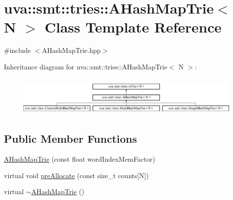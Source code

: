 \hypertarget{classuva_1_1smt_1_1tries_1_1_a_hash_map_trie}{}\section{uva\+:\+:smt\+:\+:tries\+:\+:A\+Hash\+Map\+Trie$<$ N $>$ Class Template Reference}
\label{classuva_1_1smt_1_1tries_1_1_a_hash_map_trie}


{\ttfamily \#include $<$A\+Hash\+Map\+Trie.\+hpp$>$}

Inheritance diagram for uva\+:\+:smt\+:\+:tries\+:\+:A\+Hash\+Map\+Trie$<$ N $>$\+:\begin{figure}[H]
\begin{center}
\leavevmode
\includegraphics[height=2.007169cm]{classuva_1_1smt_1_1tries_1_1_a_hash_map_trie}
\end{center}
\end{figure}
\subsection*{Public Member Functions}
\begin{DoxyCompactItemize}
\item 
\hyperlink{classuva_1_1smt_1_1tries_1_1_a_hash_map_trie_a97fbb7a95590096e7416f82b2016998e}{A\+Hash\+Map\+Trie} (const float word\+Index\+Mem\+Factor)
\item 
virtual void \hyperlink{classuva_1_1smt_1_1tries_1_1_a_hash_map_trie_ad867b72350326f464b563fba6727ba5f}{pre\+Allocate} (const size\+\_\+t counts\mbox{[}N\mbox{]})
\item 
virtual \hyperlink{classuva_1_1smt_1_1tries_1_1_a_hash_map_trie_a5118f2f3566fd37b41998ef405ca6df1}{$\sim$\+A\+Hash\+Map\+Trie} ()
\end{DoxyCompactItemize}

